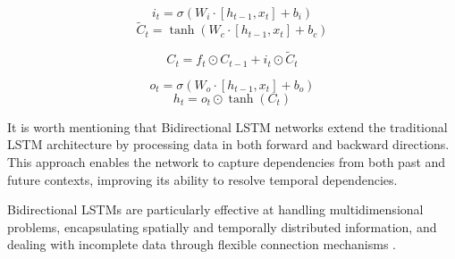 \begin{equation}
	i_t = \sigma \left( W_i \cdot [h_{t-1}, x_t] + b_i \right)
\end{equation}
\begin{equation}
	\tilde{C}_t = \tanh \left( W_c \cdot [h_{t-1}, x_t] + b_c \right)
\end{equation}

\begin{equation}
	C_t = f_t \odot C_{t-1} + i_t \odot \tilde{C}_t
\end{equation}

\begin{equation}
	o_t = \sigma \left( W_o \cdot [h_{t-1}, x_t] + b_o \right)
\end{equation}
\begin{equation}
	h_t = o_t \odot \tanh(C_t)
\end{equation}


It is worth mentioning that Bidirectional LSTM networks extend the traditional LSTM architecture by processing data in both forward and backward directions. This approach enables the network to capture dependencies from both past and future contexts, improving its ability to resolve temporal dependencies. 

Bidirectional LSTMs are particularly effective at handling multidimensional problems, encapsulating spatially and temporally distributed information, and dealing with incomplete data through flexible connection mechanisms \cite{hochreiter1997long}. 
